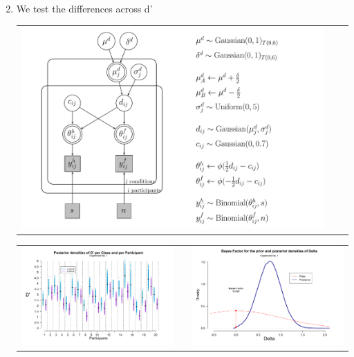 \documentclass[final]{beamer}
\newlength{\onecolwid}
\newlength{\twocolwid}
\begin{document}
\begin{frame}[t]
\begin{columns}[t]
\begin{column}{\twocolwid}
\begin{columns}[t,totalwidth=\twocolwid]
\begin{column}{\onecolwid}
\begin{alertblock}{}
\begin{enumerate}
$\qquad$

\item We test the differences across d'
\begin{center}
\begin{tabular}{ccc}
\includegraphics[width=0.7\linewidth]{Figures/1_DiffD.pdf}
\end{tabular}
\end{center}

\begin{center}
\begin{tabular}{ccc}
\includegraphics[width=0.5\linewidth]{Figures/1-Exp1_1.pdf} & \hfill & \includegraphics[width=0.45\linewidth]{Figures/1-Exp1_2.pdf}
\end{tabular}
\end{center}


\end{enumerate}
\end{alertblock}
\end{column}
\end{columns}
\end{column}
\end{columns}
\end{frame}
\end{document}
